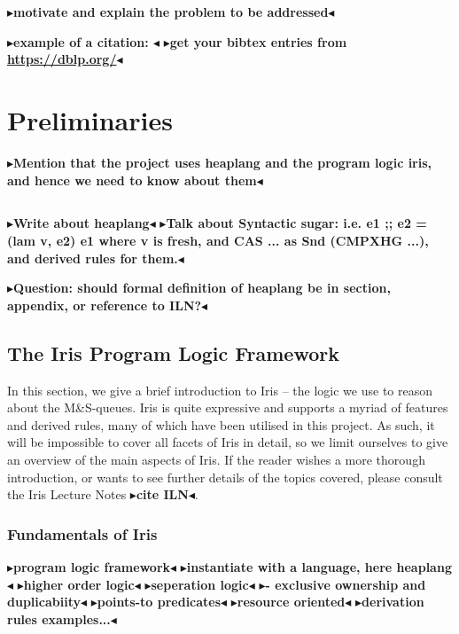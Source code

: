 \documentclass[a4paper, 11pt]{report}
\newcommand{\todo}[1]{{\color[rgb]{.5,0,0}\textbf{$\blacktriangleright$#1$\blacktriangleleft$}}}
\begin{document}
\todo{motivate and explain the problem to be addressed}

\todo{example of a citation: \cite{DBLP:conf/podc/MichaelS96}}
\todo{get your bibtex entries from \url{https://dblp.org/}}


\chapter{Preliminaries}
\label{ch:preliminaries}

\todo{Mention that the project uses heaplang and the program logic iris, and hence we need to know about them}


\section{\heaplang}
\label{Pre:section:heaplang}

\todo{Write about heaplang}
\todo{Talk about Syntactic sugar: i.e. e1 ;; e2 = (lam v, e2) e1 where v is fresh, and CAS ... as Snd (CMPXHG ...), and derived rules for them.}

\todo{Question: should formal definition of heaplang be in section, appendix, or reference to ILN?}

\section{The Iris Program Logic Framework}
\label{Pre:section:iris}
In this section, we give a brief introduction to Iris -- the logic we use to reason about the M\&S-queues. Iris is quite expressive and supports a myriad of features and derived rules, many of which have been utilised in this project. As such, it will be impossible to cover all facets of Iris in detail, so we limit ourselves to give an overview of the main aspects of Iris. If the reader wishes a more thorough introduction, or wants to see further details of the topics covered, please consult the Iris Lecture Notes \todo{cite ILN}.

\subsection{Fundamentals of Iris}
\todo{program logic framework}
\todo{instantiate with a language, here heaplang}
\todo{higher order logic}
\todo{seperation logic}
\todo{- exclusive ownership and duplicabiity}
\todo{points-to predicates}
\todo{resource oriented}
\todo{derivation rules examples...}
\end{document}
